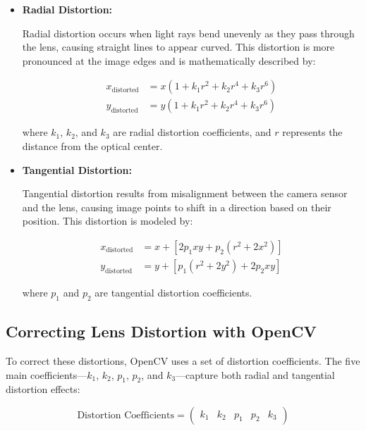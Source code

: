 \begin{itemize}
    \item \textbf{Radial Distortion:}
    
    Radial distortion occurs when light rays bend unevenly as they pass through the lens, causing straight lines to appear curved. This distortion is more pronounced at the image edges and is mathematically described by:

    \begin{align}
        x_{\text{distorted}} &= x \left(1 + k_1 r^2 + k_2 r^4 + k_3 r^6\right) \\
        y_{\text{distorted}} &= y \left(1 + k_1 r^2 + k_2 r^4 + k_3 r^6\right)
    \end{align}

    where \( k_1 \), \( k_2 \), and \( k_3 \) are radial distortion coefficients, and \( r \) represents the distance from the optical center.

    \item \textbf{Tangential Distortion:}
    
    Tangential distortion results from misalignment between the camera sensor and the lens, causing image points to shift in a direction based on their position. This distortion is modeled by:

    \begin{align}
        x_{\text{distorted}} &= x + \left[2 p_1 x y + p_2 \left(r^2 + 2 x^2\right)\right] \\
        y_{\text{distorted}} &= y + \left[p_1 \left(r^2 + 2 y^2\right) + 2 p_2 x y\right]
    \end{align}

    where \( p_1 \) and \( p_2 \) are tangential distortion coefficients.
\end{itemize}

\subsection{Correcting Lens Distortion with OpenCV}

\noindent To correct these distortions, OpenCV uses a set of distortion coefficients. The five main coefficients—\( k_1 \), \( k_2 \), \( p_1 \), \( p_2 \), and \( k_3 \)—capture both radial and tangential distortion effects:

\begin{equation}
    \text{Distortion Coefficients} = \left(\begin{array}{lllll}
        k_1 & k_2 & p_1 & p_2 & k_3
    \end{array}\right)
\end{equation}

